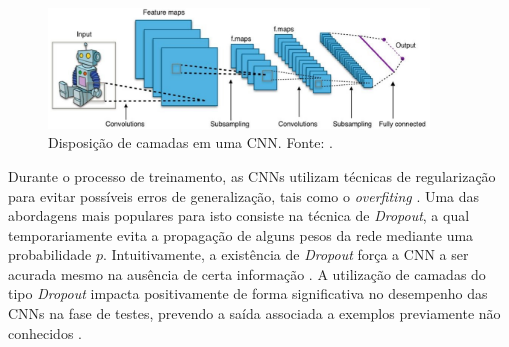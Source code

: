 \begin{figure}[!ht]
	\centering
  \caption{Disposição de camadas em uma CNN. Fonte: \cite{ref:gulli}.}   \label{img:convolucao3}
	\includegraphics[width=0.9\textwidth]{./img/cnn}
\end{figure}

Durante o processo de treinamento, as CNNs utilizam técnicas de regularização para  evitar possíveis erros de generalização, tais como o \emph{overfiting}  \cite{ref:goodfellow}.  Uma das abordagens mais populares para isto consiste na técnica de \emph{Dropout}, a qual temporariamente evita a propagação de alguns pesos da rede mediante uma probabilidade $p$. Intuitivamente, a existência de \emph{Dropout} força a CNN a ser acurada mesmo na ausência de certa informação \cite{ref:buduma}. A utilização de camadas do tipo \textit{Dropout} impacta positivamente de forma significativa no desempenho das CNNs na fase de testes, prevendo a saída associada a exemplos previamente não conhecidos \cite{ref:khan}.
